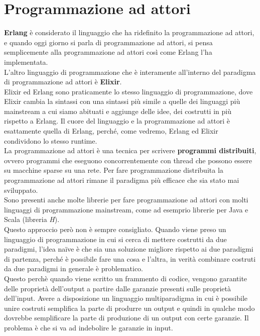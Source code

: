 \documentclass{article}
\begin{document}
\pagestyle{empty}

\section*{Programmazione ad attori}
\large

\textbf{Erlang} è considerato il linguaggio che ha ridefinito la programmazione ad attori, e quando oggi giorno si parla di programmazione ad attori, si pensa semplicemente alla programmazione ad attori così come Erlang l'ha implementata.\\
L'altro linguaggio di programmazione che è interamente all'interno del paradigma di programmazione ad attori è \textbf{Elixir}.\\
Elixir ed Erlang sono praticamente lo stesso linguaggio di programmazione, dove Elixir cambia la sintassi con una sintassi più simile a quelle dei linguaggi più mainstream a cui siamo abituati e aggiunge delle idee, dei costrutti in più rispetto a Erlang. Il cuore del linguaggio e la programmazione ad attori è esattamente quella di Erlang, perché, come vedremo, Erlang ed Elixir condividono lo stesso runtime.\vspace{14pt}\\
La programmazione ad attori è una tecnica per scrivere \textbf{programmi distribuiti}, ovvero programmi che eseguono concorrentemente con thread che possono essere su macchine sparse su una rete. Per fare programmazione distribuita la programmazione ad attori rimane il paradigma più efficace che sia stato mai sviluppato.\vspace{14pt}\\
Sono presenti anche molte librerie per fare programmazione ad attori con molti linguaggi di programmazione mainstream, come ad esemprio librerie per Java e Scala (libreria \textit{H}).\\
Questo approccio però non è sempre consigliato. Quando viene preso un linguaggio di programmazione in cui si cerca di mettere costrutti da due paradigmi, l'idea naïve è che sia una soluzione migliore rispetto ai due paradigmi di partenza, perché è possibile fare una cosa e l'altra, in verità combinare costruti da due paradigmi in generale è problematico.\vspace{14pt}\\
Questo perchè quando viene scritto un frammento di codice, vengono garantite delle proprietà dell'output a partire dalle garanzie presenti sulle proprietà dell'input. Avere a disposizione un linguaggio multiparadigma in cui è possibile unire costruti semplifica la parte di produrre un output e quindi in qualche modo dovrebbe semplificare la parte di produzione di un output con certe garanzie. Il problema è che si va ad indebolire le garanzie in input.\\
\end{document}
